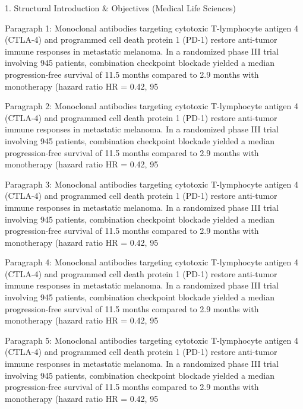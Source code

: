 1. Structural Introduction & Objectives (Medical Life Sciences)


Paragraph 1: Monoclonal antibodies targeting cytotoxic T-lymphocyte antigen 4 (CTLA-4) and programmed cell death protein 1 (PD-1) restore anti-tumor immune responses in metastatic melanoma. In a randomized phase III trial involving 945 patients, combination checkpoint blockade yielded a median progression-free survival of 11.5 months compared to 2.9 months with monotherapy (hazard ratio HR = 0.42, 95%

Paragraph 2: Monoclonal antibodies targeting cytotoxic T-lymphocyte antigen 4 (CTLA-4) and programmed cell death protein 1 (PD-1) restore anti-tumor immune responses in metastatic melanoma. In a randomized phase III trial involving 945 patients, combination checkpoint blockade yielded a median progression-free survival of 11.5 months compared to 2.9 months with monotherapy (hazard ratio HR = 0.42, 95%

Paragraph 3: Monoclonal antibodies targeting cytotoxic T-lymphocyte antigen 4 (CTLA-4) and programmed cell death protein 1 (PD-1) restore anti-tumor immune responses in metastatic melanoma. In a randomized phase III trial involving 945 patients, combination checkpoint blockade yielded a median progression-free survival of 11.5 months compared to 2.9 months with monotherapy (hazard ratio HR = 0.42, 95%

Paragraph 4: Monoclonal antibodies targeting cytotoxic T-lymphocyte antigen 4 (CTLA-4) and programmed cell death protein 1 (PD-1) restore anti-tumor immune responses in metastatic melanoma. In a randomized phase III trial involving 945 patients, combination checkpoint blockade yielded a median progression-free survival of 11.5 months compared to 2.9 months with monotherapy (hazard ratio HR = 0.42, 95%

Paragraph 5: Monoclonal antibodies targeting cytotoxic T-lymphocyte antigen 4 (CTLA-4) and programmed cell death protein 1 (PD-1) restore anti-tumor immune responses in metastatic melanoma. In a randomized phase III trial involving 945 patients, combination checkpoint blockade yielded a median progression-free survival of 11.5 months compared to 2.9 months with monotherapy (hazard ratio HR = 0.42, 95%


